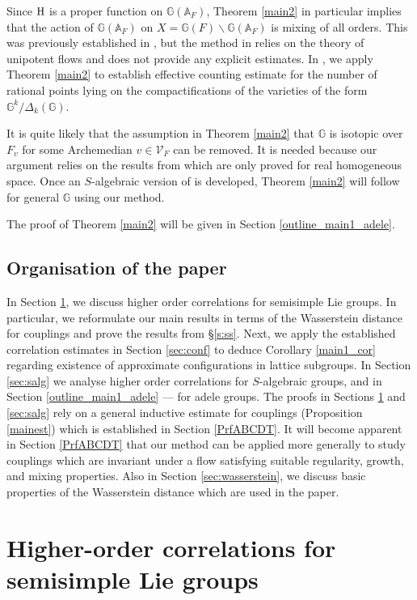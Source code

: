 \documentclass[11pt,reqno,a4paper]{amsart}
\numberwithin{equation}{section}
\newcommand{\bA}{\mathbb{A}}
\newcommand{\bG}{\mathbb{G}}
\theoremstyle{theorem}
\theoremstyle{definition}
\begin{document}
Since $\hbox{H}$ is a proper function on $\bG(\bA_F)$, Theorem \ref{main2} in particular implies that the action of $\bG(\bA_F)$ on $X = \bG(F) \backslash \bG(\bA_F)$
is mixing of all orders. This was previously established in \cite{GBTT},
but the method in \cite{GBTT} relies on the theory of unipotent flows
and does not provide any explicit estimates.
In \cite{BEG}, we apply Theorem \ref{main2} to establish effective
counting estimate for the number of rational points
lying on the compactifications of the varieties of the form $\bG^k/\Delta_k(\bG)$.


It is quite likely that the assumption in Theorem \ref{main2} that $\bG$ is isotopic over $F_v$ for some Archemedian $v\in\mathcal{V}_F$ can be removed. It is needed because 
our argument relies on the results from \cite{EMV} 
which are only proved for real homogeneous space. 
Once an $S$-algebraic version of \cite{EMV} is developed,
Theorem \ref{main2} will follow for general $\bG$ using our method.

The proof of Theorem \ref{main2} will be given in Section \ref{outline_main1_adele}.



\subsection{Organisation of the paper}
In Section \ref{outline_main1_0}, we discuss higher order correlations for 
semisimple Lie groups. 
In particular, we reformulate our main results in terms of the Wasserstein distance
for couplings and prove the results from \S\ref{s:ss}. 
Next, we apply the established correlation
estimates in Section \ref{sec:conf} to deduce Corollary \ref{main1_cor} regarding existence of approximate configurations in lattice subgroups. 
In Section \ref{sec:salg} we analyse higher order correlations for $S$-algebraic groups,
and in Section \ref{outline_main1_adele} --- for adele groups.
The proofs in Sections \ref{outline_main1_0} and \ref{sec:salg}
rely on a general inductive estimate for couplings 
(Proposition \ref{mainest}) which is established in Section \ref{PrfABCDT}.
It will become apparent in Section \ref{PrfABCDT} that our method
can be applied more generally to study couplings which are invariant under a flow
satisfying suitable regularity, growth, and mixing properties.
Also in Section \ref{sec:wasserstein}, we discuss basic properties of 
the Wasserstein distance which are used in the paper.

\section{Higher-order correlations for semisimple Lie groups}
\label{outline_main1_0}
\end{document}
